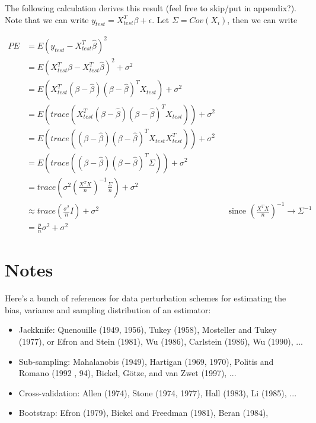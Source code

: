 The following calculation derives this result (feel free to skip/put in appendix?). Note that we can write $y_{test} = X^T_{test} \beta + \epsilon$. Let $\Sigma = Cov(X_i)$, then we can write

\begin{align*}
PE &= E( y_{test} - X_{test}^T \hat{\beta})^2\\
 & = E(X_{test}^T \beta - X_{test}^T \hat{\beta})^2 + \sigma^2\\
& = E(X_{test}^T(\beta - \hat{\beta})(\beta - \hat{\beta})^T X_{test}) + \sigma^2\\
& = E( trace(X_{test}^T(\beta - \hat{\beta})(\beta - \hat{\beta})^T X_{test})) + \sigma^2\\
& = E( trace((\beta - \hat{\beta})(\beta - \hat{\beta})^TX_{test} X_{test}^T)) + \sigma^2\\
& = E( trace((\beta - \hat{\beta})(\beta - \hat{\beta})^T\Sigma)) + \sigma^2\\
& = trace\left( \sigma^2 \left( \frac{X^TX}{n} \right)^{-1} \frac{\Sigma}{n} \right) + \sigma^2\\
& \approx trace\left( \frac{\sigma^2}{n} I \right) + \sigma^2 && \text{since }\left(\frac{X^TX}{n} \right)^{-1} \rightarrow \Sigma^{-1} \\
& = \frac{p}{n} \sigma^2 + \sigma^2
\end{align*}






\section{Notes}

Here's a bunch of references for data perturbation schemes for estimating the bias, variance and sampling distribution of an estimator:

\begin{itemize}
\item Jackknife: Quenouille (1949, 1956), Tukey (1958), Mosteller and Tukey (1977), or Efron and Stein (1981), Wu (1986), Carlstein (1986), Wu (1990), ... 
\item Sub-sampling: Mahalanobis (1949), Hartigan (1969, 1970), Politis and Romano (1992 , 94), Bickel, G\"{o}tze, and van Zwet (1997), ...
\item Cross-validation:  Allen (1974), Stone (1974, 1977), Hall (1983), Li (1985), ...
\item Bootstrap: Efron (1979), Bickel and Freedman (1981), Beran (1984),
\end{itemize}
